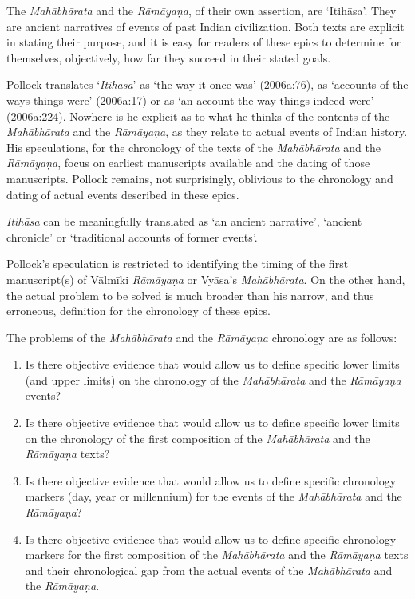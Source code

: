 The \textit{Mahābhārata} and the \textit{Rāmāyaṇa}, of their own assertion, are ‘Itihāsa’. They are ancient narratives of events of past Indian civilization. Both texts are explicit in stating their purpose, and it is easy for readers of these epics to determine for themselves, objectively, how far they succeed in their stated goals.

Pollock translates ‘\textit{Itihāsa}’ as ‘the way it once was’ (2006a:76), as ‘accounts of the ways things were’ (2006a:17) or as ‘an account the way things indeed were’ (2006a:224). Nowhere is he explicit as to what he thinks of the contents of the \textit{Mahābhārata} and the \textit{Rāmāyaṇa}, as they relate to actual events of Indian history. His speculations, for the chronology of the texts of the \textit{Mahābhārata} and the \textit{Rāmāyaṇa}, focus on earliest manuscripts available and the dating of those manuscripts. Pollock remains, not surprisingly, oblivious to the chronology and dating of actual events described in these epics.

\newpage

\textit{Itihāsa} can be meaningfully translated as ‘an ancient narrative’, ‘ancient chronicle’ or ‘traditional accounts of former events’.

Pollock’s speculation is restricted to identifying the timing of the first manuscript(s) of Vālmīki \textit{Rāmāyaṇa} or Vyāsa’s \textit{Mahābhārata}. On the other hand, the actual problem to be solved is much broader than his narrow, and thus erroneous, definition for the chronology of these epics.

The problems of the \textit{Mahābhārata} and the \textit{Rāmāyaṇa} chronology are as follows:

\begin{enumerate}
\itemsep=0pt
\item Is there objective evidence that would allow us to define specific lower limits (and upper limits) on the chronology of the \textit{Mahābhārata} and the \textit{Rāmāyaṇa} events?

 \item Is there objective evidence that would allow us to define specific lower limits on the chronology of the first composition of the \textit{Mahābhārata} and the \textit{Rāmāyaṇa} texts?

 \item Is there objective evidence that would allow us to define specific chronology markers (day, year or millennium) for the events of the \textit{Mahābhārata} and the \textit{Rāmāyaṇa}?

 \item Is there objective evidence that would allow us to define specific chronology markers for the first composition of the \textit{Mahābhārata} and the \textit{Rāmāyaṇa} texts and their chronological gap from the actual events of the \textit{Mahābhārata} and the \textit{Rāmāyaṇa}.

\end{enumerate}


